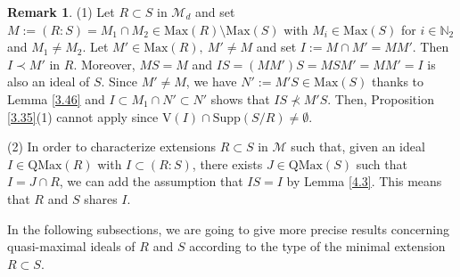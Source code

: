 \documentclass[12pt,leqno]{amsart}
\theoremstyle{definition}
\newtheorem{remark}[theorem]{Remark}
\begin{document}
\begin{remark}\label{4.4} (1) Let $R\subset S$ in $\mathcal M_d$ and set $ M:=(R:S)=M_1\cap M_2\in\mathrm{Max}(R)\setminus\mathrm{Max}(S)$ with $M_i\in\mathrm{Max}(S)$ for $i\in\mathbb N_2$ and $ M_1\neq M_2 $. Let $M'\in\mathrm{Max}(R),\ M'\neq M$ and set $I:=M\cap M'=MM'$. Then $I\prec M'$ in $R$. Moreover, $MS=M$ and $IS=(MM')S=MSM'=MM' =I$ is also an ideal of $S$. Since $M'\neq M$, we have $N':=M'S\in\mathrm{Max}(S)$ thanks to Lemma \ref{3.46} and $I\subset M_1\cap N' \subset N'$ shows that $IS\not\prec M'S$. Then, Proposition \ref{3.35}(1) cannot apply since $\mathrm{V}(I)\cap\mathrm{Supp}(S/R)\neq\emptyset$.

(2) In order to characterize extensions $R\subset S$ in $\mathcal M$ such that, given an ideal $I\in\mathrm{QMax}(R)$ with $I\subset(R:S)$, there exists $J\in\mathrm{QMax}(S)$ such that $I=J\cap R$, we can add the assumption that $IS=I$ by Lemma \ref{4.3}. This means that $R$ and $S$ shares $I$.
\end{remark}

In the following subsections, we are going to give more precise results concerning quasi-maximal ideals of $R$ and $S$ according to the type of the minimal extension $R\subset S$.
\end{document}
